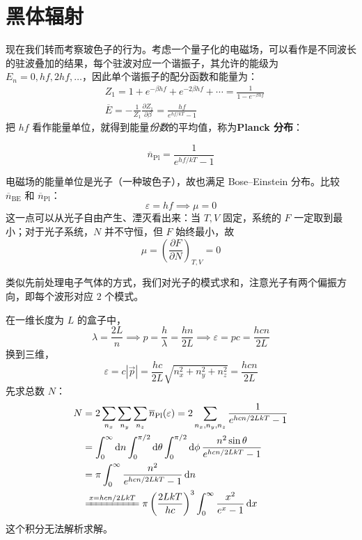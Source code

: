 \section{黑体辐射}
现在我们转而考察玻色子的行为。考虑一个量子化的电磁场，可以看作是不同波长的驻波叠加的结果，每个驻波对应一个谐振子，其允许的能级为 $E_n=0,hf,2hf,\dots$，因此单个谐振子的配分函数和能量为：
\begin{align}
    &Z_1=1+e^{-\beta hf}+e^{-2\beta hf}+\cdots=\frac{1}{1-e^{-\beta hf}}\\
    &\overline E=-\frac{1}{Z_1}\frac{\partial Z_1}{\partial \beta}=\frac{hf}{e^{hf/kT}-1}
\end{align}
把 $hf$ 看作能量单位，就得到能量\textit{份数}的平均值，称为\textbf{Planck 分布}：
\begin{definition}[Planck 分布]
    \begin{equation}
        \overline n_{\mathrm{Pl}}=\frac{1}{e^{hf/kT}-1}
    \end{equation}
\end{definition}

电磁场的能量单位是光子（一种玻色子），故也满足 Bose--Einstein 分布。比较 $\overline n_{\mathrm{BE}}$ 和 $\overline n_{\mathrm{Pl}}$：
\begin{equation}
    \varepsilon=hf\implies\mu=0
\end{equation}
这一点可以从光子自由产生、湮灭看出来：当 $T,V$ 固定，系统的 $F$ 一定取到最小；对于光子系统，$N$ 并不守恒，但 $F$ 始终最小，故
\begin{equation}
    \mu=\left(\frac{\partial F}{\partial N}\right)_{T,V}=0
\end{equation}

类似先前处理电子气体的方式，我们对光子的模式求和，注意光子有两个偏振方向，即每个波形对应 $2$ 个模式。

在一维长度为 $L$ 的盒子中，
\begin{equation}
    \lambda=\frac{2L}{n}\implies p=\frac{h}{\lambda}=\frac{hn}{2L}\implies \varepsilon=pc=\frac{hcn}{2L}
\end{equation}
换到三维，
\begin{equation}
    \varepsilon=c|\vec p|=\frac{hc}{2L}\sqrt{n_x^2+n_y^2+n_z^2}=\frac{hcn}{2L}
\end{equation}
先求总数 $N$：
\begin{equation}
    \begin{split}
        N
        &=2\sum_{n_x}\sum_{n_y}\sum_{n_z}\overline n_{\mathrm{Pl}}(\varepsilon)
        =2\sum_{n_x,n_y,n_z}\frac{1}{e^{hcn/2LkT}-1}\\
        &=\int_0^{\infty}\mathrm{d}n\int_0^{\pi/2}\mathrm{d}\theta\int_0^{\pi/2}\mathrm{d}\phi\,\frac{n^2\sin\theta}{e^{hc n/2LkT}-1}\\
        &=\pi\int_0^{\infty}\frac{n^2}{e^{hcn/2LkT}-1}\,\mathrm{d}n\\
        &\xlongequal{x=hcn/2LkT}\pi\left(\frac{2LkT}{hc}\right)^3\int_0^{\infty}\frac{x^2}{e^x-1}\,\mathrm{d}x
    \end{split}
\end{equation}
这个积分无法解析求解。

